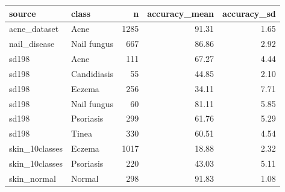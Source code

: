 \begin{tabular}{llrrr}
\toprule
source & class & n & accuracy\_mean & accuracy\_sd \\
\midrule
acne\_dataset & Acne & 1285 & 91.31 & 1.65 \\
nail\_disease & Nail fungus & 667 & 86.86 & 2.92 \\
sd198 & Acne & 111 & 67.27 & 4.44 \\
sd198 & Candidiasis & 55 & 44.85 & 2.10 \\
sd198 & Eczema & 256 & 34.11 & 7.71 \\
sd198 & Nail fungus & 60 & 81.11 & 5.85 \\
sd198 & Psoriasis & 299 & 61.76 & 5.29 \\
sd198 & Tinea & 330 & 60.51 & 4.54 \\
skin\_10classes & Eczema & 1017 & 18.88 & 2.32 \\
skin\_10classes & Psoriasis & 220 & 43.03 & 5.11 \\
skin\_normal & Normal & 298 & 91.83 & 1.08 \\
\bottomrule
\end{tabular}
